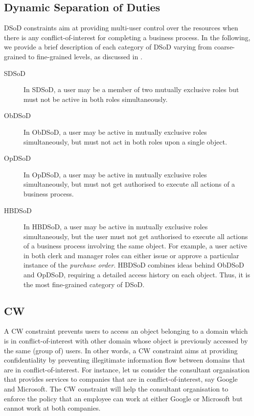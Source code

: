 \documentclass[epsfig,a4paper,11pt,titlepage]{book}
\numberwithin{algorithm}{chapter}
\begin{document}
\subsection{Dynamic Separation of Duties}
\gls{DSoD} constraints \cite{Kong:2007, Sandhu:1996, Nash:1990} aim at providing multi-user control over the resources when there is any conflict-of-interest for completing a business process. In the following, we provide a brief description of each category of \gls{DSoD} varying from coarse-grained to fine-grained levels, as discussed in \cite{Schaad:2005}.

\begin{description}

	\item[\gls{SDSoD}] In \gls{SDSoD}, a user may be a member of two mutually exclusive roles but must not be active in both roles simultaneously.
	
	\item[\gls{ObDSoD}] In \gls{ObDSoD}, a user may be active in mutually exclusive roles simultaneously, but must not act in both roles upon a single object.
	
	\item[\gls{OpDSoD}] In \gls{OpDSoD}, a user may be active in mutually exclusive roles simultaneously, but must not get authorised to execute all actions of a business process.
	
	\item[\gls{HBDSoD}] In \gls{HBDSoD}, a user may be active in mutually exclusive roles simultaneously, but the user must not get authorised to execute all actions of a business process involving the same object. For example, a user active in both clerk and manager roles can either issue or approve a particular instance of the \emph{purchase order}. \gls{HBDSoD} combines ideas behind \gls{ObDSoD} and \gls{OpDSoD}, requiring a detailed access history on each object. Thus, it is the most fine-grained category of \gls{DSoD}.

\end{description}


\subsection[Chinese Wall]{\acrlong{CW}}
A \gls{CW} constraint \cite{Brewer:1989} prevents users to access an object belonging to a domain which is in conflict-of-interest with other domain whose object is previously accessed by the same (group of) users. In other words, a \gls{CW} constraint aims at providing confidentiality by preventing illegitimate information flow between domains that are in conflict-of-interest. For instance, let us consider the consultant organisation that provides services to companies that are in conflict-of-interest, say Google and Microsoft. The \gls{CW} constraint will help the consultant organisation to enforce the policy that an employee can work at either Google or Microsoft but cannot work at both companies.
\end{document}
